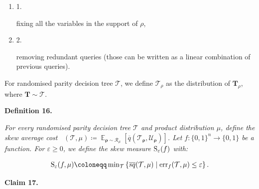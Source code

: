\begin{enumerate}


\item[] 
1. 


fixing all the variables in the support of $\rho$,\par





\item[] 
2. 


removing redundant queries (those can be written as a linear combination of previous queries).\par





\end{enumerate}


For randomised parity decision tree $\mathcal{T}$, we define $\mathcal{T}_{\rho}$ as the distribution of $\bm{T}_{\rho}$, where $\bm{T}\sim\mathcal{T}$.\par





\par\medskip\noindent\textbf{
\textbf{Definition 16}\textbf{.}
}\par



\emph{For every randomised parity decision tree $\mathcal{T}$ and product distribution $\mu$, define the skew average cost $\mathop{\overline{sq}}(\mathcal{T},\mu)\coloneqq\mathop{\mathbb{E}}_{\bm{\rho}\sim\mathcal{R}_{\mu}}[\overline{q}(\mathcal{T}_{\bm{\rho}},\mathcal{U}_{\bm{\rho}})]$. Let $f\colon\{0,1\}^{n}\to\{0,1\}$ be a function. For $\varepsilon\geq 0$, we define the skew measure ${\textup{S}}_{\varepsilon}(f)$ with:}\par


\[\begin{gathered}
{\textup{S}}_{\varepsilon}(f,\mu)\coloneqq\min\nolimits_{\mathcal{T}}\left\{\mathop{\overline{sq}}(\mathcal{T},\mu)\mid\mathrm{err}_{f}(\mathcal{T},\mu)\leq\varepsilon\right\}.
\end{gathered}\]







\par\medskip\noindent\textbf{
Claim 17. 
}\par



